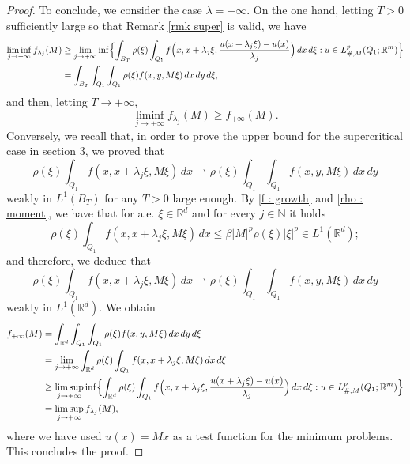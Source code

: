 \documentclass{article}
\theoremstyle{definition}
\newcommand{\N}{\mathbb{N}}
\newcommand{\R}{\mathbb{R}}
\begin{document}
\begin{proof}
To conclude, we consider the case $\lambda=+\infty$. On the one hand, letting $T>0$ sufficiently large so that Remark \ref{rmk super} is valid, we have  
\begin{align*}
    \liminf_{j\to+\infty} f_{\lambda_j}(M) & \geq \lim_{j\to+\infty} \inf\Bigl\{ \int_{B_T} \rho(\xi)\int_{Q_1} f\Bigl(x,x+\lambda_j\xi,\frac{u(x+\lambda_j\xi)-u(x)}{\lambda_j}\Bigr)\, dx\,d\xi : u\in L^p_{\#,M}(Q_1;\R^m) \Bigr\} \\
    & =  \int_{B_T} \int_{Q_1}\int_{Q_1} \rho(\xi)f(x,y,M\xi)\, dx\,dy\,d\xi,
\end{align*}
and then, letting $T\to+\infty$,
\begin{equation*}
    \liminf_{j\to+\infty} f_{\lambda_j}(M) \geq f_{+\infty}(M).
\end{equation*}
Conversely, we recall that, in order to prove the upper bound for the supercritical case in section $3$, we proved that
\begin{equation*}
\rho(\xi)\int_{Q_1} f(x,x+\lambda_j\xi,M\xi)\, dx
\rightharpoonup
    \rho(\xi)\int_{Q_1} \int_{Q_1} f(x,y,M\xi)\, dx\, dy
\end{equation*}
weakly in $L^1(B_T)$ for any $T>0$ large enough. By \eqref{f : growth} and \eqref{rho : moment}, we have that for a.e. $\xi\in\R^d$ and for every $j\in\N$ it holds
\begin{equation*}
    \rho(\xi)\int_{Q_1} f(x,x+\lambda_j\xi,M\xi)\, dx \leq \beta|M|^p\rho(\xi)|\xi|^p \in L^1(\R^d);
\end{equation*}
and therefore, we deduce that
\begin{equation*}
\rho(\xi)\int_{Q_1} f(x,x+\lambda_j\xi,M\xi)\, dx
\rightharpoonup
    \rho(\xi)\int_{Q_1} \int_{Q_1} f(x,y,M\xi)\, dx\, dy
\end{equation*}
weakly in $L^1(\R^d)$. We obtain 
\begin{align*}
f_{+\infty}(M) & = \int_{\R^d} \int_{Q_1}\int_{Q_1} \rho(\xi)f(x,y,M\xi)\, dx\,dy\,d\xi \\
& = \lim_{j\to+\infty} \int_{\R^d} \rho(\xi)\int_{Q_1} f(x,x+\lambda_j\xi,M\xi)\, dx\,d\xi \\
& \geq \limsup_{j\to+\infty} \inf\Bigl\{ \int_{\R^d} \rho(\xi)\int_{Q_1} f\Bigl(x,x+\lambda_j\xi,\frac{u(x+\lambda_j\xi)-u(x)}{\lambda_j}\Bigr)\, dx\,d\xi : u\in L^p_{\#,M}(Q_1;\R^m) \Bigr\} \\
& = \limsup_{j\to+\infty} f_{\lambda_j}(M),
\end{align*}
where we have used $u(x)=Mx$ as a test function for the minimum problems. This  concludes the proof.
\end{proof}
\end{document}
